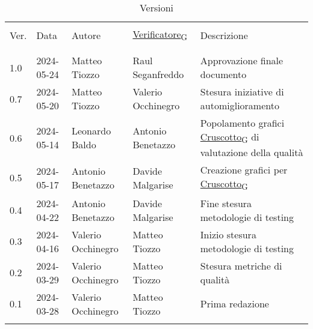 \documentclass[italian,12pt]{article} %
\begin{document}

\newpage

\captionsetup[table]{list=no}
\begin{table}[!h]
	\caption*{Versioni}
	\footnotesize
	\begin{center}
		\begin{tabular}{ l l l l p{6cm} }
			\hline                                                                                                                   \\[-2ex]
			Ver. & Data       & Autore             & \href{https://7last.github.io/docs/rtb/documentazione-interna/glossario\#verificatore}{Verificatore\textsubscript{G}}       & Descrizione                                                \\
			\\[-2ex] \hline \\[-1.5ex]
			1.0  & 2024-05-24 & Matteo Tiozzo      & Raul Seganfreddo   & Approvazione finale documento                              \\
			0.7  & 2024-05-20 & Matteo Tiozzo      & Valerio Occhinegro & Stesura iniziative di automiglioramento                    \\
			0.6  & 2024-05-14 & Leonardo Baldo     & Antonio Benetazzo  & Popolamento grafici \href{https://7last.github.io/docs/rtb/documentazione-interna/glossario\#cruscotto}{Cruscotto\textsubscript{G}} di valutazione della qualità \\
			0.5  & 2024-05-17 & Antonio Benetazzo  & Davide Malgarise   & Creazione grafici per \href{https://7last.github.io/docs/rtb/documentazione-interna/glossario\#cruscotto}{Cruscotto\textsubscript{G}}                            \\
			0.4  & 2024-04-22 & Antonio Benetazzo  & Davide Malgarise   & Fine stesura metodologie di testing                        \\
			0.3  & 2024-04-16 & Valerio Occhinegro & Matteo Tiozzo      & Inizio stesura metodologie di testing                      \\
			0.2  & 2024-03-29 & Valerio Occhinegro & Matteo Tiozzo      & Stesura metriche di qualità                                \\
			0.1  & 2024-03-28 & Valerio Occhinegro & Matteo Tiozzo      & Prima redazione                                            \\
			\\[-1.5ex] \hline
		\end{tabular}
	\end{center}
\end{table}
\captionsetup[table]{list=yes}
\newpage
\tableofcontents
\listoftables
\listoffigures
\newpage





\end{document}
